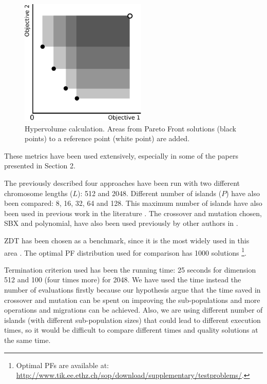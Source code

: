 \documentclass[Crown,sagev,times,doublespace]{sagej}
\begin{document}
\begin{figure}
\centering
\includegraphics[width=6cm]{hypervolume.pdf}
\caption{Hypervolume calculation. Areas from Pareto Front solutions (black points) to a reference point (white point) are added.}
\label{fig:hypervolume}
\end{figure}


These metrics have been used extensively, especially in some of the papers presented in Section 2.

The previously described four approaches have been run with two different chromosome lengths ($L$): 512 and 2048. Different number of islands ($P$) have also been compared: 8, 16, 32, 64 and 128. This maximum number of islands have also been  used in previous work in the literature \citep{Martens13asynchronous}. The crossover and mutation chosen, SBX and polynomial, have also been  used previously by other authors in \citep{Durillo08masterslave}. 

ZDT \citep{zdt2000a} has been chosen as a benchmark, since it is the most widely used in this area \citep{Deb03distributed,Martens13asynchronous,Wang09parallel,Durillo08masterslave}. The optimal PF distribution used for comparison has 1000 solutions \footnote{Optimal PFs are available at:   \url{http://www.tik.ee.ethz.ch/sop/download/supplementary/testproblems/}.}. 





Termination criterion used has been the running time: 25 seconds for dimension 512 and 100 (four times more) for 2048. We have used the time instead the number of evaluations firstly because our hypothesis argue that the time saved in crossover and mutation can be spent on improving the sub-populations and more operations and migrations can be achieved. Also, we are using different number of islands (with different sub-population sizes) that could lead to different execution times, so it would be difficult to compare different times and quality solutions at the same time.
\end{document}
